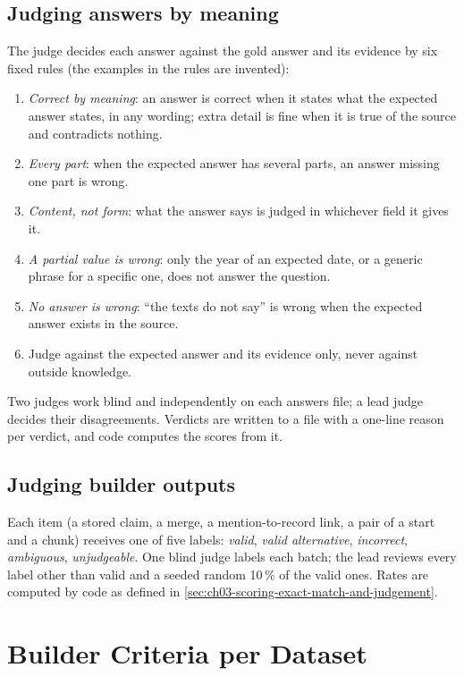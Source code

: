 \section*{Judging answers by meaning}
The judge decides each answer against the gold answer and its evidence by six fixed rules (the examples in the rules
are invented):
\begin{enumerate}[nosep]
\item \emph{Correct by meaning}: an answer is correct when it states what the expected answer states, in any wording;
extra detail is fine when it is true of the source and contradicts nothing.
\item \emph{Every part}: when the expected answer has several parts, an answer missing one part is wrong.
\item \emph{Content, not form}: what the answer says is judged in whichever field it gives it.
\item \emph{A partial value is wrong}: only the year of an expected date, or a generic phrase for a specific one, does
not answer the question.
\item \emph{No answer is wrong}: ``the texts do not say'' is wrong when the expected answer exists in the source.
\item Judge against the expected answer and its evidence only, never against outside knowledge.
\end{enumerate}
Two judges work blind and independently on each answers file; a lead judge decides their disagreements. Verdicts are
written to a file with a one-line reason per verdict, and code computes the scores from it.

\section*{Judging builder outputs}
Each item (a stored claim, a merge, a mention-to-record link, a pair of a start and a chunk) receives one of five
labels: \emph{valid}, \emph{valid alternative}, \emph{incorrect}, \emph{ambiguous}, \emph{unjudgeable}. One blind judge
labels each batch; the lead reviews every label other than valid and a seeded random 10\,\% of the valid ones. Rates
are computed by code as defined in \cref{sec:ch03-scoring-exact-match-and-judgement}.

\chapter{Builder Criteria per Dataset}\label{app:builder-criteria-per-dataset}

